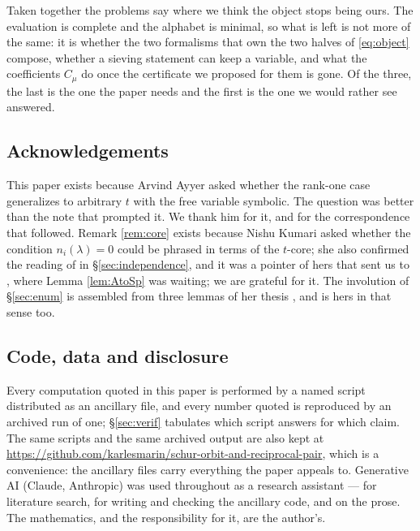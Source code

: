 \documentclass[11pt,reqno]{amsart}
\theoremstyle{plain}
\theoremstyle{definition}
\begin{document}
Taken together the problems say where we think the object stops being ours. The evaluation is
complete and the alphabet is minimal, so what is left is not more of the same: it is whether the two
formalisms that own the two halves of \eqref{eq:object} compose, whether a sieving statement can keep
a variable, and what the coefficients $C_\mu$ do once the certificate we proposed for them is gone.
Of the three, the last is the one the paper needs and the first is the one we would rather see
answered.

\subsection*{Acknowledgements}
This paper exists because Arvind Ayyer asked whether the rank-one case generalizes to arbitrary $t$
with the free variable symbolic. The question was better than the note that prompted it. We thank him
for it, and for the correspondence that followed. Remark \ref{rem:core} exists because Nishu Kumari
asked whether the condition $n_i(\lambda)=0$ could be phrased in terms of the $t$-core; she also
confirmed the reading of \cite[Theorem 5.3]{AK25} in \S\ref{sec:independence}, and it was a pointer
of hers that sent us to \cite[\S3]{AK25}, where Lemma \ref{lem:AtoSp} was waiting; we are grateful
for it. The involution of \S\ref{sec:enum} is assembled from three lemmas of her thesis
\cite{KumariThesis}, and is hers in that sense too.

\subsection*{Code, data and disclosure}
Every computation quoted in this paper is performed by a named script distributed as an ancillary
file, and every number quoted is reproduced by an archived run of one; \S\ref{sec:verif} tabulates
which script answers for which claim. The same scripts and the same archived output are also kept at
\url{https://github.com/karlesmarin/schur-orbit-and-reciprocal-pair}, which is a convenience: the
ancillary files carry everything the paper appeals to. Generative AI (Claude, Anthropic) was used
throughout as a
research assistant --- for literature search, for writing and checking the ancillary code, and on the
prose. The mathematics, and the responsibility for it, are the author's.
\end{document}
